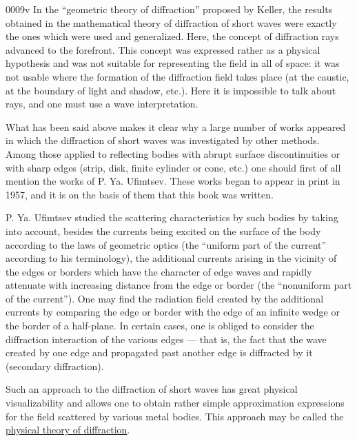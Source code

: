 \begin{scanpage}{0009}{v}
In the ``geometric theory of diffraction'' proposed by Keller, the results obtained in the mathematical theory of diffraction of short waves were exactly the ones which were used and generalized. Here, the concept of diffraction rays advanced to the forefront. This concept was expressed rather as a physical hypothesis and was not suitable for representing the field in all of space: it was not usable where the formation of the diffraction field takes place (at the caustic, at the boundary of light and shadow, etc.). Here it is impossible to talk about rays, and one must use a wave interpretation.

What has been said above makes it clear why a large number of works appeared in which the diffraction of short waves was investigated by other methods. Among those applied to reflecting bodies with abrupt surface discontinuities or with sharp edges (strip, disk, finite cylinder or cone, etc.) one should first of all mention the works of P. Ya. Ufimtsev. These works began to appear in print in 1957, and it is on the basis of them that this book was written.

P. Ya. Ufimtsev studied the scattering characteristics by such bodies by taking into account, besides the currents being excited on the surface of the body according to the laws of geometric optics (the ``uniform part of the current'' according to his terminology), the additional currents arising in the vicinity of the edges or borders which have the character of edge waves and rapidly attenuate with increasing distance from the edge or border (the ``nonuniform part of the current''). One may find the radiation field created by the additional currents by comparing the edge or border with the edge of an infinite wedge or the border of a half-plane. In certain cases, one is obliged to consider the diffraction interaction of the various edges --- that is, the fact that the wave created by one edge and propagated past another edge is diffracted by it (secondary diffraction).

Such an approach to the diffraction of short waves has great physical visualizability and allows one to obtain rather simple approximation expressions for the field scattered by various metal bodies. This approach may be called the \uline{physical theory of diffraction}.
\end{scanpage}

